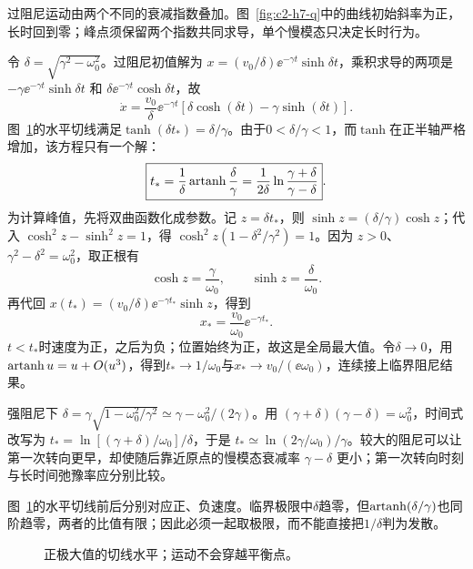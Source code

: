 \begin{solution}
过阻尼运动由两个不同的衰减指数叠加。图~\ref{fig:c2-h7-q}中的曲线初始斜率为正，长时回到零；峰点须保留两个指数共同求导，单个慢模态只决定长时行为。


令 $\delta=\sqrt{\gamma^2-\omega_0^2}$。过阻尼初值解为 $x=(v_0/\delta)\ee^{-\gamma t}\sinh\delta t$，乘积求导的两项是 $-\gamma\ee^{-\gamma t}\sinh\delta t$ 和 $\delta\ee^{-\gamma t}\cosh\delta t$，故
\[\dot x=\frac{v_0}{\delta}\ee^{-\gamma t}
 [\delta\cosh(\delta t)-\gamma\sinh(\delta t)].\]
图~\ref{fig:c2-h7-s}的水平切线满足$\tanh(\delta t_*)=\delta/\gamma$。由于$0<\delta/\gamma<1$，而$\tanh$在正半轴严格增加，该方程只有一个解：
\[\boxed{t_* =\frac1\delta\operatorname{artanh}\frac\delta\gamma
 =\frac1{2\delta}\ln\frac{\gamma+\delta}{\gamma-\delta}}.\]
为计算峰值，先将双曲函数化成参数。记 $z=\delta t_*$，则 $\sinh z=(\delta/\gamma)\cosh z$；代入 $\cosh^2z-\sinh^2z=1$，得 $\cosh^2z(1-\delta^2/\gamma^2)=1$。因为 $z>0$、$\gamma^2-\delta^2=\omega_0^2$，取正根有
\[
\cosh z=\frac\gamma{\omega_0},\qquad \sinh z=\frac\delta{\omega_0}.
\]
再代回 $x(t_*)=(v_0/\delta)\ee^{-\gamma t_*}\sinh z$，得到
\[\boxed{x_* =\frac{v_0}{\omega_0}\ee^{-\gamma t_*}}.\]
$t<t_*$时速度为正，之后为负；位置始终为正，故这是全局最大值。令$\delta\to0$，用$\operatorname{artanh} u=u+O(u^3)$，得到$t_*\to1/\omega_0$与$x_*\to v_0/(\ee\omega_0)$，连续接上临界阻尼结果。

强阻尼下 $\delta=\gamma\sqrt{1-\omega_0^2/\gamma^2}\simeq\gamma-\omega_0^2/(2\gamma)$。用 $(\gamma+\delta)(\gamma-\delta)=\omega_0^2$，时间式改写为 $t_*=\ln[(\gamma+\delta)/\omega_0]/\delta$，于是 $t_*\simeq\ln(2\gamma/\omega_0)/\gamma$。较大的阻尼可以让第一次转向更早，却使随后靠近原点的慢模态衰减率 $\gamma-\delta$ 更小；第一次转向时刻与长时间弛豫率应分别比较。


图~\ref{fig:c2-h7-s}的水平切线前后分别对应正、负速度。临界极限中$\delta$趋零，但$\operatorname{artanh}(\delta/\gamma)$也同阶趋零，两者的比值有限；因此必须一起取极限，而不能直接把$1/\delta$判为发散。

\begin{figure}[H]\centering
{}
\caption{正极大值的切线水平；运动不会穿越平衡点。}\label{fig:c2-h7-s}
\end{figure}
\end{solution}

